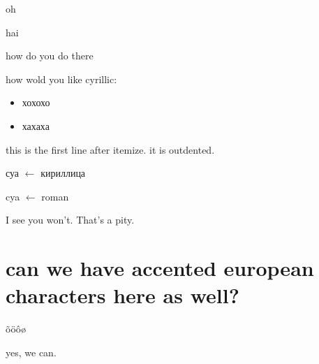 \documentclass{article}
\begin{document}
oh

hai


how do you do 
there

how wold you like cyrillic: 
\begin{itemize}
\item хохохо
\item хахаха
\end{itemize}
this is the first line after itemize. it is outdented.

суа $\leftarrow$ кириллица

cya $\leftarrow$ roman

I see you won't. That's a pity.

\section{can we have accented european characters here as well?}
õöôø

yes, we can.
\end{document}
